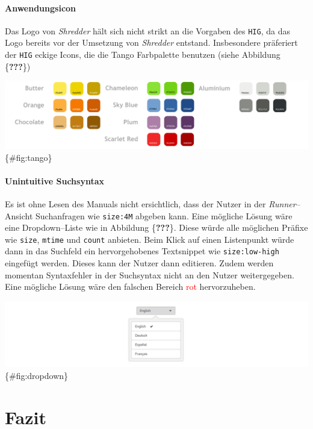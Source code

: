 \documentclass[11pt,ngerman,toc=listof,index=totoc]{scrreprt}
\begin{document}
\subsubsection{Anwendungsicon}\label{anwendungsicon}

Das Logo von \emph{Shredder} hält sich nicht strikt an die Vorgaben des
\texttt{HIG}, da das Logo bereits vor der Umsetzung von \emph{Shredder}
entstand. Insbesondere präferiert der \texttt{HIG} eckige Icons, die die
Tango Farbpalette benutzen (siehe Abbildung \{\textbf{???}\})

\includegraphics{docs/pics/tango.png} \{\#fig:tango\}

\subsubsection{Unintuitive Suchsyntax}\label{unintuitive-suchsyntax}

Es ist ohne Lesen des Manuals nicht ersichtlich, dass der Nutzer in der
\emph{Runner}--Ansicht Suchanfragen wie \texttt{size:4M} abgeben kann.
Eine mögliche Lösung wäre eine Dropdown--Liste wie in Abbildung
\{\textbf{???}\}. Diese würde alle möglichen Präfixe wie \texttt{size},
\texttt{mtime} und \texttt{count} anbieten. Beim Klick auf einen
Listenpunkt würde dann in das Suchfeld ein hervorgehobenes Textsnippet
wie \texttt{size:low-high} eingefügt werden. Dieses kann der Nutzer dann
editieren. Zudem werden momentan Syntaxfehler in der Suchsyntax nicht an
den Nutzer weitergegeben. Eine mögliche Lösung wäre den falschen Bereich
\textcolor{red}{rot} hervorzuheben.

\includegraphics{docs/pics/dropdown.png} \{\#fig:dropdown\}

\chapter{Fazit}\label{fazit}
\end{document}
